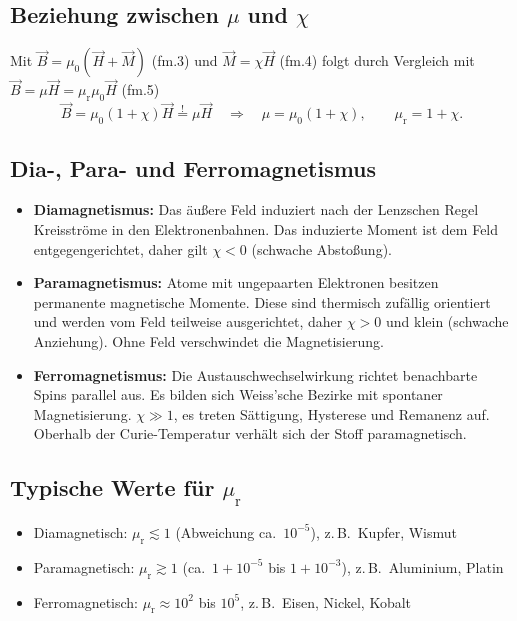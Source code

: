 \documentclass[a4paper,11pt]{article}
\begin{document}
\subsection{Beziehung zwischen $\mu$ und $\chi$}
Mit $\vec B=\mu_0(\vec H+\vec M)$ (fm.3) und $\vec M=\chi\vec H$ (fm.4) folgt
durch Vergleich mit $\vec B=\mu\vec H=\mu_\mathrm{r}\mu_0\vec H$ (fm.5)
\begin{equation}
  \vec B=\mu_0(1+\chi)\vec H \overset{!}{=} \mu\vec H
  \quad\Rightarrow\quad \mu=\mu_0(1+\chi),\qquad \mu_\mathrm{r}=1+\chi .
  \tag{fm.6}
  \label{eq:fm6}
\end{equation}

\subsection{Dia-, Para- und Ferromagnetismus}
\begin{itemize}
  \item \textbf{Diamagnetismus:} Das äußere Feld induziert nach der Lenzschen
        Regel Kreisströme in den Elektronenbahnen. Das induzierte Moment ist dem
        Feld entgegengerichtet, daher gilt $\chi<0$ (schwache Abstoßung).
  \item \textbf{Paramagnetismus:} Atome mit ungepaarten Elektronen besitzen
        permanente magnetische Momente. Diese sind thermisch zufällig orientiert
        und werden vom Feld teilweise ausgerichtet, daher $\chi>0$ und klein
        (schwache Anziehung). Ohne Feld verschwindet die Magnetisierung.
  \item \textbf{Ferromagnetismus:} Die Austauschwechselwirkung richtet benachbarte
        Spins parallel aus. Es bilden sich Weiss'sche Bezirke mit spontaner
        Magnetisierung. $\chi\gg1$, es treten Sättigung, Hysterese und Remanenz
        auf. Oberhalb der Curie-Temperatur verhält sich der Stoff paramagnetisch.
\end{itemize}

\subsection{Typische Werte für $\mu_\mathrm{r}$}
\begin{itemize}
  \item Diamagnetisch: $\mu_\mathrm{r}\lesssim1$ (Abweichung ca.\ $10^{-5}$), z.\,B.\ Kupfer, Wismut
  \item Paramagnetisch: $\mu_\mathrm{r}\gtrsim1$ (ca.\ $1+10^{-5}$ bis $1+10^{-3}$), z.\,B.\ Aluminium, Platin
  \item Ferromagnetisch: $\mu_\mathrm{r}\approx10^{2}$ bis $10^{5}$, z.\,B.\ Eisen, Nickel, Kobalt
\end{itemize}
\end{document}
